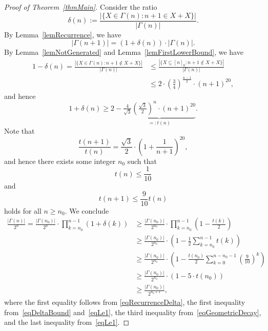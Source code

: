 \documentclass{article}
\begin{document}
\begin{proof}[Proof of Theorem~\ref{thmMain}]
    Consider the ratio
    \[
        \delta(n) := \frac{|\{X \in \Gamma(n) : n + 1 \in X + X\}|}{|\Gamma(n)|}.
    \]
    By Lemma~\ref{lemRecurrence}, we have
    \begin{equation}
        \label{eqRecurrenceDelta}
        |\Gamma(n+1)| = (1 + \delta(n)) \cdot |\Gamma(n)|.
    \end{equation}
    By Lemma~\ref{lemNotGenerated} and Lemma~\ref{lemFirstLowerBound}, we have
    \begin{align*}
        1 - \delta(n)
        = \frac{|\{X \in \Gamma(n) : n + 1 \notin X + X\}|}{|\Gamma(n)|}
        & \le \frac{|\{X \subseteq [n]_0 : n + 1 \notin X + X\}|}{|\Gamma(n)|} \\
        & \le 2 \cdot \left( \frac{3}{4} \right)^{\frac{n-1}{2}} \cdot (n+1)^{20},
    \end{align*}
    and hence
    \begin{equation}
        \label{eqDeltaBound}
        1 + \delta(n) \ge 2 - \underbrace{\tfrac{4}{\sqrt{3}} \left( \tfrac{\sqrt{3}}{2} \right)^n \cdot (n+1)^{20}}_{=: t(n)}.
    \end{equation}
    Note that
    \[
        \frac{t(n+1)}{t(n)} = \frac{\sqrt{3}}{2} \cdot \left( 1 + \frac{1}{n+1} \right)^{20},
    \]
    and hence there exists some integer $n_0$ such that
    \begin{equation}
        \label{eqLe1}
        t(n) \le \frac{1}{10}
    \end{equation}
    and
    \begin{equation}
        \label{eqGeometricDecay}
        t(n + 1) \le \frac{9}{10} t(n)
    \end{equation}
    holds for all $n \ge n_0$.
    We conclude
    \begin{align*}
        \frac{|\Gamma(n)|}{2^n}
        = \frac{|\Gamma(n_0)|}{2^{n}} \cdot \prod_{k=n_0}^{n - 1} (1 + \delta(k))
        & \ge \frac{|\Gamma(n_0)|}{2^{n_0}} \cdot \prod_{k=n_0}^{n - 1} \left( 1 - \frac{t(k)}{2} \right) \\
        & \ge \frac{|\Gamma(n_0)|}{2^{n_0}} \cdot \left( 1 - \frac{1}{2} \sum_{k=n_0}^{n - 1} t(k) \right) \\
        & \ge \frac{|\Gamma(n_0)|}{2^{n_0}} \cdot \left( 1 - \frac{t(n_0)}{2} \sum_{k=0}^{n - n_0 - 1} \left( \frac{9}{10}\right)^k \right) \\
        & \ge \frac{|\Gamma(n_0)|}{2^{n_0}} \cdot \left( 1 - 5 \cdot t(n_0) \right) \\
        & \ge \frac{|\Gamma(n_0)|}{2^{n_0 + 1}},
    \end{align*}    
    where the first equality follows from \eqref{eqRecurrenceDelta}, the first inequality from~\eqref{eqDeltaBound} and~\eqref{eqLe1}, the third inequality from~\eqref{eqGeometricDecay}, and the last inequality from~\eqref{eqLe1}.
\end{proof}

          
   
\end{document}
